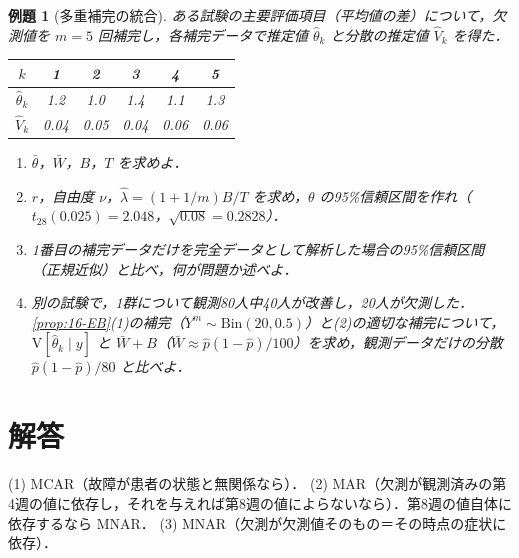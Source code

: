 \documentclass[a4paper,11pt,openany]{ltjsbook}
\newtheorem{reidai}{例題}[chapter]
\newenvironment{kaitou}[1]{%
  \par\medskip\noindent
  \begin{tcolorbox}[enhanced,breakable,colback=bkgray!3,colframe=bkgray!60,boxrule=0.4pt,
    left=4pt,right=4pt,top=2pt,bottom=2pt,arc=1pt,
    title={\cref{#1}の解答},fonttitle=\bfseries\small,coltitle=white,colbacktitle=bkgray!80]}%
  {\end{tcolorbox}\par}
\newcommand{\V}{\mathrm{V}}
\newcommand{\Bin}{\mathrm{Bin}}
\begin{document}
\begin{reidai}[多重補完の統合]\label{reidai:16-4}
ある試験の主要評価項目（平均値の差）について，欠測値を $m=5$ 回補完し，各補完データで推定値 $\hat\theta_k$ と分散の推定値 $\hat V_k$ を得た．
\begin{center}\small
\begin{tabular}{@{}cccccc@{}}
\toprule
$k$ & 1 & 2 & 3 & 4 & 5\\
\midrule
$\hat\theta_k$ & 1.2 & 1.0 & 1.4 & 1.1 & 1.3\\
$\hat V_k$ & 0.04 & 0.05 & 0.04 & 0.06 & 0.06\\
\bottomrule
\end{tabular}
\end{center}
\begin{enumerate}[label=(\arabic*)]
\item $\bar\theta$，$\bar W$，$B$，$T$ を求めよ．
\item $r$，自由度 $\nu$，$\hat\lambda=(1+1/m)B/T$ を求め，$\theta$ の95\%信頼区間を作れ（$t_{28}(0.025)=2.048$，$\sqrt{0.08}=0.2828$）．
\item 1番目の補完データだけを完全データとして解析した場合の95\%信頼区間（正規近似）と比べ，何が問題か述べよ．
\item 別の試験で，1群について観測80人中40人が改善し，20人が欠測した．\cref{prop:16-EB}(1)の補完（$Y^m\sim\Bin(20,0.5)$）と(2)の適切な補完について，$\V[\hat\theta_k\mid y]$ と $\bar W+B$（$\bar W\approx\hat p(1-\hat p)/100$）を求め，観測データだけの分散 $\hat p(1-\hat p)/80$ と比べよ．
\end{enumerate}
\end{reidai}

\section{解答}\label{sec:16-sol}
\begin{kaitou}{reidai:16-1}
(1) MCAR（故障が患者の状態と無関係なら）．
(2) MAR（欠測が観測済みの第4週の値に依存し，それを与えれば第8週の値によらないなら）．第8週の値自体に依存するなら MNAR．
(3) MNAR（欠測が欠測値そのもの＝その時点の症状に依存）．
\end{kaitou}
\end{document}
